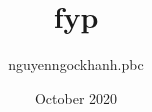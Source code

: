 \documentclass{report}
\title{fyp}
\author{nguyenngockhanh.pbc }
\date{October 2020}
\begin{document}




\begin{abstract}

\end{abstract}

\renewcommand{\abstractname}{Acknowledgements}
\begin{abstract}

\end{abstract}

\tableofcontents
\listoffigures









\end{document}

